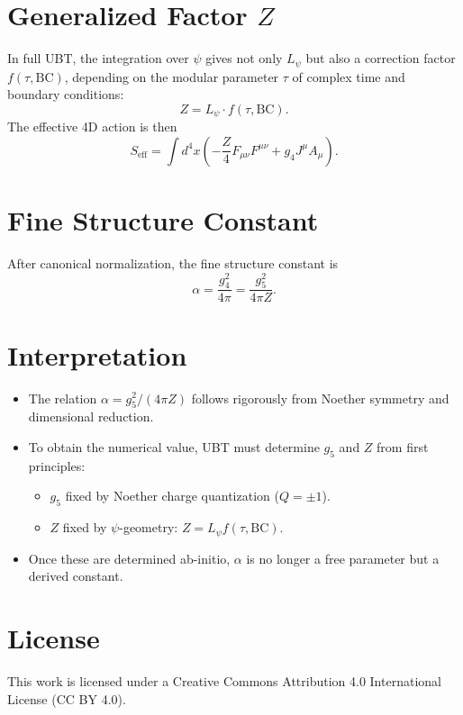 \documentclass[12pt]{article}
\begin{document}
\section{Generalized Factor $Z$}
In full UBT, the integration over $\psi$ gives not only $L_\psi$ but also a correction factor $f(\tau,\text{BC})$, 
depending on the modular parameter $\tau$ of complex time and boundary conditions:
\begin{equation}
Z = L_\psi \cdot f(\tau,\text{BC}).
\end{equation}
The effective 4D action is then
\begin{equation}
S_{\text{eff}} = \int d^4x \left( -\frac{Z}{4}F_{\mu\nu}F^{\mu\nu} + g_4 J^\mu A_\mu \right).
\end{equation}

\section{Fine Structure Constant}
After canonical normalization, the fine structure constant is
\begin{equation}
\alpha = \frac{g_4^2}{4\pi} = \frac{g_5^2}{4\pi Z}.
\end{equation}

\section{Interpretation}
\begin{itemize}
\item The relation $\alpha = g_5^2 / (4\pi Z)$ follows rigorously from Noether symmetry and dimensional reduction.
\item To obtain the numerical value, UBT must determine $g_5$ and $Z$ from first principles:
  \begin{itemize}
  \item $g_5$ fixed by Noether charge quantization ($Q=\pm1$).
  \item $Z$ fixed by $\psi$-geometry: $Z=L_\psi f(\tau,\text{BC})$.
  \end{itemize}
\item Once these are determined ab-initio, $\alpha$ is no longer a free parameter but a derived constant.
\end{itemize}


\section*{License}
This work is licensed under a Creative Commons Attribution 4.0 International License (CC BY 4.0).
\end{document}
